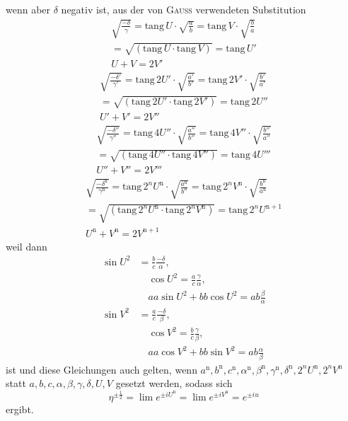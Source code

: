 wenn aber $\delta$ negativ ist, aus der von \textsc{Gauss} verwendeten Substitution
\[
\begin{gathered}
\surd{\frac{-\delta}{\gamma}}
=\mathrm{tang}\,U\cdot\surd{\frac ab}
=\mathrm{tang}\,V\cdot\surd{\frac ba}
\\=\surd{(\mathrm{tang}\,U\cdot\mathrm{tang}\,V)}
=\mathrm{tang}\,U'\\
U+V=2V'
\end{gathered}
\]
\[
\begin{gathered}
\surd{\frac{-\delta'}{\gamma'}}
=\mathrm{tang}\,2U'\cdot\surd{\frac{a'}{b'}}
=\mathrm{tang}\,2V'\cdot\surd{\frac{b'}{a'}}
\\=\surd{(\mathrm{tang}\,2U'\cdot\mathrm{tang}\,2V')}
=\mathrm{tang}\,2U''\\
U'+V'=2V''
\end{gathered}
\]
\[
\begin{gathered}
\surd{\frac{-\delta''}{\gamma''}}
=\mathrm{tang}\,4U''\cdot\surd{\frac{a''}{b''}}
=\mathrm{tang}\,4V''\cdot\surd{\frac{b''}{a''}}
\\=\surd{(\mathrm{tang}\,4U''\cdot\mathrm{tang}\,4V'')}
=\mathrm{tang}\,4U'''\\
U''+V''=2V'''
\end{gathered}
\]
\[
\begin{gathered}
\surd{\frac{-\delta^{\mathrm n}}{\gamma^{\mathrm n}}}
=\mathrm{tang}\,2^nU^{\mathrm n}\cdot\surd{\frac{a^{\mathrm n}}{b^{\mathrm n}}}
=\mathrm{tang}\,2^nV^{\mathrm n}\cdot\surd{\frac{b^{\mathrm n}}{a^{\mathrm n}}}
\\=\surd{(\mathrm{tang}\,2^nU^{\mathrm n}\cdot\mathrm{tang}\,2^nV^{\mathrm n})}
=\mathrm{tang}\,2^nU^{\mathrm n+1}\\
U^{\mathrm n}+V^{\mathrm n}=2V^{\mathrm n+1}
\end{gathered}
\]
weil dann
\[
\begin{aligned}
\sin U^2&=\frac bc\frac{-\delta}{\alpha},\\[4pt]&\quad
\cos U^2=\frac ac\frac\gamma\alpha,\\[4pt]&\quad
aa\sin U^2+bb\cos U^2=ab\frac\beta\alpha\\[4pt]
\sin V^2&=\frac ac\frac{-\delta}{\beta},\\[4pt]&\quad
\cos V^2=\frac bc\frac\gamma\beta,\\[4pt]&\quad
aa\cos V^2+bb\sin V^2=ab\frac\alpha\beta
\end{aligned}
\]
ist und diese Gleichungen auch gelten, wenn $a^{\mathrm n},\allowbreak b^{\mathrm n},\allowbreak c^{\mathrm n},\allowbreak \alpha^{\mathrm n},\allowbreak \beta^{\mathrm n},\allowbreak \gamma^{\mathrm n},\allowbreak \delta^{\mathrm n},\allowbreak 2^nU^{\mathrm n},\allowbreak 2^nV^{\mathrm n}$
statt $a,\allowbreak b,\allowbreak c,\allowbreak \alpha,\allowbreak \beta,\allowbreak \gamma,\allowbreak \delta,\allowbreak U,\allowbreak V$ gesetzt werden, sodass sich
\[
\eta^{\pm\frac12}
=\lim e^{\pm iU^{\mathrm n}}=\lim e^{\pm iV^{\mathrm n}}=e^{\pm iu}
\]
ergibt.

